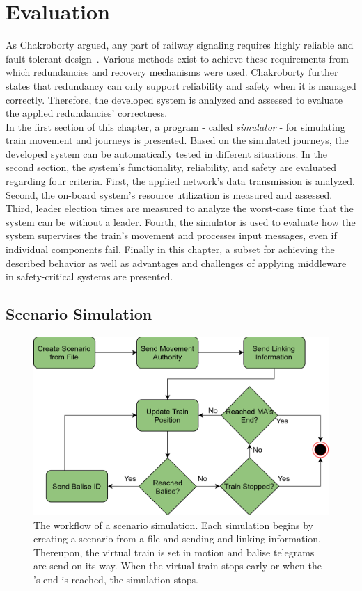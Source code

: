 \chapter{Evaluation}
\label{cpt:evaluation}

As Chakroborty argued, any part of railway signaling requires highly reliable and fault-tolerant design~\cite{ChakrabortyFaultTolerantRailway}.
Various methods exist to achieve these requirements from which redundancies and recovery mechanisms were used.
Chakroborty further states that redundancy can only support reliability and safety when it is managed correctly.
Therefore, the developed system is analyzed and assessed to evaluate the applied redundancies' correctness.
\\

In the first section of this chapter, a program - called \textit{simulator} - for simulating train movement and journeys is presented.
Based on the simulated journeys, the developed system can be automatically tested in different situations.
In the second section, the system's functionality, reliability, and safety are evaluated regarding four criteria.
First, the applied network's data transmission is analyzed.
Second, the on-board system's resource utilization is measured and assessed.
Third, leader election times are measured to analyze the worst-case time that the system can be without a leader.
Fourth, the simulator is used to evaluate how the system supervises the train's movement and processes input messages, even if individual components fail.
Finally in this chapter, a  subset for achieving the described behavior as well as advantages and challenges of applying  middleware in safety-critical systems are presented.


\section{Scenario Simulation}
\label{subsec:ScenarioSimulation}

\begin{figure}[!htb]
	\centering
	\includegraphics[width=0.8\linewidth]{images/SimulatorWorkflow}
	\caption{The workflow of a scenario simulation. Each simulation begins by creating a scenario from a file and sending  and linking information. Thereupon, the virtual train is set in motion and balise telegrams are send on its way. When the virtual train stops early or when the 's end is reached, the simulation stops.}
	\label{fig:SimulatorWorkflow}
\end{figure}

